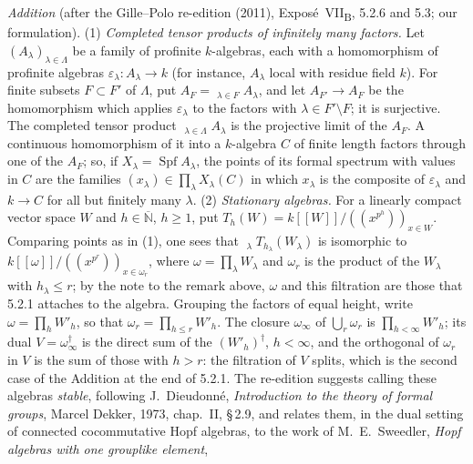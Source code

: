 \medskip
\noindent\emph{Addition} (after the Gille--Polo re-edition (2011),
Expos\'e~VII\textsubscript{B}, 5.2.6 and 5.3; our formulation).
(1) \emph{Completed tensor products of infinitely many factors.} Let
\((A_\lambda)_{\lambda\in\Lambda}\) be a family of profinite
\(k\)-algebras, each with a homomorphism of profinite algebras
\(\varepsilon_\lambda:A_\lambda\to k\) (for instance, \(A_\lambda\) local
with residue field \(k\)). For finite subsets \(F\subset F'\) of
\(\Lambda\), put
\(A_F=\mathop{\widehat{\bigotimes}}\nolimits_{\lambda\in F}A_\lambda\),
and let \(A_{F'}\to A_F\) be the homomorphism which applies
\(\varepsilon_\lambda\) to the factors with \(\lambda\in F'\setminus F\);
it is surjective. The completed tensor product
\(\mathop{\widehat{\bigotimes}}\nolimits_{\lambda\in\Lambda}A_\lambda\) is
the projective limit of the \(A_F\). A continuous homomorphism of it into
a \(k\)-algebra \(C\) of finite length factors through one of the
\(A_F\); so, if \(X_\lambda=\operatorname{Spf}A_\lambda\), the points of
its formal spectrum with values in \(C\) are the families
\((x_\lambda)\in\prod_\lambda X_\lambda(C)\) in which \(x_\lambda\) is the
composite of \(\varepsilon_\lambda\) and \(k\to C\) for all but finitely
many \(\lambda\).
(2) \emph{Stationary algebras.} For a linearly compact vector space
\(W\) and \(h\in\overline{\mathbb N}\), \(h\geq1\), put
\(T_h(W)=k[[W]]/((x^{p^h}))_{x\in W}\). Comparing points as in (1), one
sees that
\(\mathop{\widehat{\bigotimes}}\nolimits_\lambda T_{h_\lambda}(W_\lambda)\)
is isomorphic to \(k[[\omega]]/((x^{p^r}))_{x\in\omega_r}\), where
\(\omega=\prod_\lambda W_\lambda\) and \(\omega_r\) is the product of the
\(W_\lambda\) with \(h_\lambda\leq r\); by the note to the remark above,
\(\omega\) and this filtration are those that 5.2.1 attaches to the
algebra. Grouping the factors of equal height, write
\(\omega=\prod_hW'_h\), so that \(\omega_r=\prod_{h\leq r}W'_h\). The
closure \(\omega_\infty\) of \(\bigcup_r\omega_r\) is
\(\prod_{h<\infty}W'_h\); its dual \(V=\omega_\infty^\dagger\) is the
direct sum of the \((W'_h)^\dagger\), \(h<\infty\), and the orthogonal of
\(\omega_r\) in \(V\) is the sum of those with \(h>r\): the filtration of
\(V\) splits, which is the second case of the Addition at the end of
5.2.1. The re-edition suggests calling these algebras \emph{stable},
following J.~Dieudonn\'e, \emph{Introduction to the theory of formal
groups}, Marcel Dekker, 1973, chap.~II, \S\,2.9, and relates them, in
the dual setting of connected cocommutative Hopf algebras, to the work
of M.~E.~Sweedler, \emph{Hopf algebras with one grouplike element},
